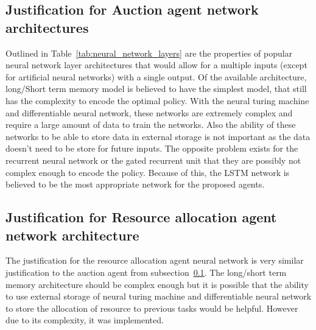 \subsection{Justification for Auction agent network architectures}\label{subsec:justification-for-auction-agent-network-architectures}
Outlined in Table~\ref{tab:neural_network_layers} are the properties of popular neural network layer architectures that
would allow for a multiple inputs (except for artificial neural networks) with a single output. Of the available
architecture, long/Short term memory model is believed to have the simplest model, that still has the complexity to
encode the optimal policy. With the neural turing machine and differentiable neural network, these networks are
extremely complex and require a large amount of data to train the networks. Also the ability of these networks to be
able to store data in external storage is not important as the data doesn't need to be store for future inputs. The
opposite problem exists for the recurrent neural network or the gated recurrent unit that they are possibly not complex
enough to encode the policy. Because of this, the LSTM network is believed to be the most appropriate network for the
proposed agents.

\subsection{Justification for Resource allocation agent network architecture}\label{subsec:justification-for-resource-allocation-agent-network-architecture}
The justification for the resource allocation agent neural network is very similar justification to the auction agent
from subsection~\ref{subsec:justification-for-auction-agent-network-architectures}. The long/short term memory
architecture should be complex enough but it is possible that the ability to use external storage of neural turing
machine and differentiable neural network to store the allocation of resource to previous tasks would be helpful.
However due to its complexity, it was implemented.

